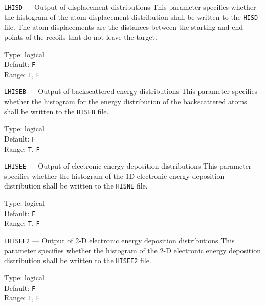 \begin{keydescription}{\texttt{LHISD} --- Output of displacement distributions}
%
  This parameter specifies whether the histogram of the atom displacement distribution shall be 
  written to the \texttt{HISD} file. The atom displacements are the distances between the 
  starting and end points of the recoils that do not leave the target.
  \begin{keytab}
    Type:    \> logical \\
    Default: \> \texttt{F} \\
    Range:   \> \texttt{T}, \texttt{F} 
  \end{keytab}
\end{keydescription}

\begin{keydescription}{\texttt{LHISEB} --- Output of backscattered energy distributions}
%
  This parameter specifies whether the histogram for the energy distribution of the 
  backscattered atoms shall be written to the \texttt{HISEB} file.
  \begin{keytab}
    Type:    \> logical \\
    Default: \> \texttt{F} \\
    Range:   \> \texttt{T}, \texttt{F} 
  \end{keytab}
\end{keydescription}

\begin{keydescription}{\texttt{LHISEE} --- Output of electronic energy deposition 
    distributions}
%
  This parameter specifies whether the histogram of the 1D electronic energy
  deposition distribution shall be written to the \texttt{HISNE} file.
  \begin{keytab}
    Type:    \> logical \\
    Default: \> \texttt{F} \\
    Range:   \> \texttt{T}, \texttt{F} 
  \end{keytab}
\end{keydescription}

\begin{keydescription}{\texttt{LHISEE2} --- Output of 2-D electronic energy deposition distributions}
%
  This parameter specifies whether the histogram of the 2-D electronic energy
  deposition distribution shall be written to the \texttt{HISEE2} file.
  \begin{keytab}
    Type:    \> logical \\
    Default: \> \texttt{F} \\
    Range:   \> \texttt{T}, \texttt{F} 
  \end{keytab}
\end{keydescription}


